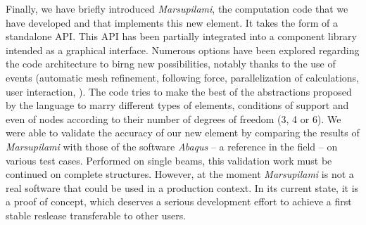 Finally, we have briefly introduced \emph{Marsupilami}, the computation code that we have developed and that implements this new element. It takes the form of a standalone \Csharp{} API. This API has been partially integrated into a \grasshopper{} component library intended as a graphical interface. Numerous options have been explored regarding the code architecture to birng new possibilities, notably thanks to the use of events (automatic mesh refinement, following force, parallelization of calculations, user interaction, \telp{}). The code tries to make the best of the abstractions proposed by the language \Csharp{} to marry different types of elements, conditions of support and even of nodes according to their number of degrees of freedom (3, 4 or 6). We were able to validate the accuracy of our new element by comparing the results of \emph{Marsupilami} with those of the software \emph{Abaqus} -- a reference in the field -- on various test cases. Performed on single beams, this validation work must be continued on complete structures. However, at the moment \emph{Marsupilami} is not a real software that could be used in a production context. In its current state, it is a proof of concept, which deserves a serious development effort to achieve a first stable reslease transferable to other users.